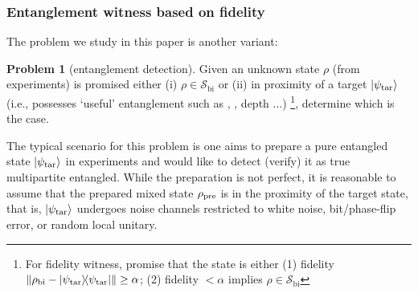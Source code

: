 \documentclass[
aps,
pra,
twocolumn,
floatfix,
]{revtex4-2}
\theoremstyle{plain}
\theoremstyle{definition}
\newtheorem{problem}{Problem}
\newcommand{\dm}{\rho}
\newcommand{\bi}{\text{bi}}
\newcommand{\target}{\textup{tar}}
\newcommand{\prepare}{\textup{pre}}
\newcommand{\separable}{\mathcal{S}}
\newcommand{\ppartition}{\mathcal{P}}
\begin{document}
\subsubsection{Entanglement witness based on fidelity}\label{sec:entanglement_witness}
The problem we study in this paper is another variant:
\begin{problem}[entanglement detection]\label{prm:entanglement_detection}
	Given an unknown state $\dm$ (from experiments) is promised either (i) $\dm\in\separable_{\bi}$
	or (ii) in proximity of a target $\ket{\psi_{\target}}$ (i.e., possesses `useful' entanglement such as , , depth ...) 
	\footnote{
		For fidelity witness, promise that the state is either 
		(1) fidelity $\norm{\dm_{\bi}-\op{\psi_\target}}\ge \alpha$; 
		(2) fidelity $< \alpha$ implies $\dm\in\separable_{\bi}$
	},
	determine which is the case.
\end{problem}
The typical scenario for this problem is one aims to prepare a pure entangled state $\ket{\psi_\target}$ in experiments and would like to detect (verify) it as true multipartite entangled. 
While the preparation is not perfect, 
it is reasonable to assume that the prepared mixed state $\dm_{\prepare}$ is in the proximity of the target state,
that is, $\ket{\psi_{\target}}$ undergoes noise channels restricted to white noise, bit/phase-flip error, or random local unitary.
\end{document}
